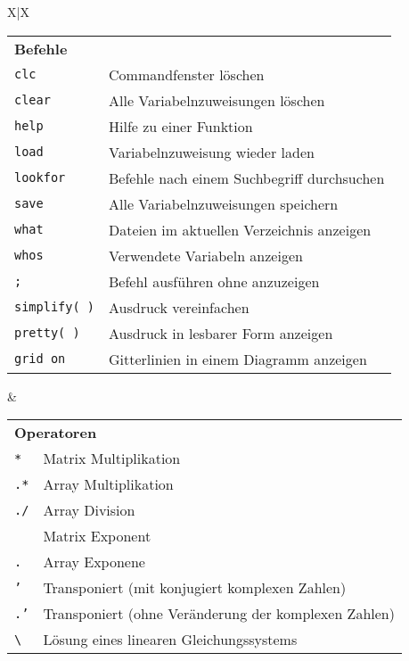 \begin{tabularx}{\textwidth}{X|X}
  \begin{tabular}{ll}
      \multicolumn{2}{l}{\textbf{Befehle}}
    \\
      \texttt{clc}      & Commandfenster löschen
    \\
  		\texttt{clear}    &	Alle Variabelnzuweisungen löschen
  	\\
  	  \texttt{help}     & Hilfe zu einer Funktion
  	\\
      \texttt{load}     & Variabelnzuweisung wieder laden
    \\
      \texttt{lookfor}  & Befehle nach einem Suchbegriff durchsuchen
    \\
      \texttt{save}     & Alle Variabelnzuweisungen speichern
    \\
      \texttt{what}     & Dateien im aktuellen Verzeichnis anzeigen
    \\
      \texttt{whos}     & Verwendete Variabeln anzeigen
    \\
      \texttt{;}        & Befehl ausführen ohne anzuzeigen
    \\
      \texttt{simplify( )} & Ausdruck vereinfachen
    \\
      \texttt{pretty( )}   & Ausdruck in lesbarer Form anzeigen
    \\
      \texttt{grid on}  & Gitterlinien in einem Diagramm anzeigen
  \end{tabular}
  
& %

  \begin{tabular}{ll}
    \multicolumn{2}{l}{\textbf{Operatoren}}
    \\
      \texttt{*}        & Matrix Multiplikation
    \\
      \texttt{.*}       & Array Multiplikation
    \\
      \texttt{./}       & Array Division
    \\
      \texttt{\hoch}    & Matrix Exponent
    \\
      \texttt{.\hoch}   & Array Exponene
    \\
      \texttt{'}        & Transponiert (mit konjugiert komplexen Zahlen)
    \\
      \texttt{.'}       & Transponiert (ohne Veränderung der komplexen Zahlen)
    \\
      \texttt{\textbackslash} & Lösung eines linearen Gleichungssystems
  \end{tabular}
  

\end{tabularx}
